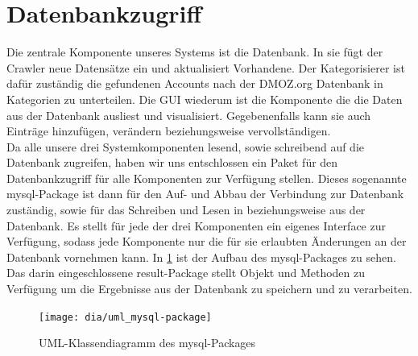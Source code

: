 \section{Datenbankzugriff}\label{sec:datenbankzugriff}
Die zentrale Komponente unseres Systems ist die Datenbank. In sie fügt der Crawler neue Datensätze ein und aktualisiert Vorhandene. Der Kategorisierer ist dafür zuständig die gefundenen Accounts nach der DMOZ.org Datenbank in Kategorien zu unterteilen. Die GUI wiederum ist die Komponente die die Daten aus der Datenbank ausliest und visualisiert. Gegebenenfalls kann sie auch Einträge hinzufügen, verändern beziehungsweise vervollständigen.
\\Da alle unsere drei Systemkomponenten lesend, sowie schreibend auf die Datenbank zugreifen, haben wir uns entschlossen ein Paket für den Datenbankzugriff für alle Komponenten zur Verfügung stellen. Dieses sogenannte mysql-Package ist dann für den Auf- und Abbau der Verbindung zur Datenbank zuständig, sowie für das Schreiben und Lesen in beziehungsweise aus der Datenbank. Es stellt für jede der drei Komponenten ein eigenes Interface zur Verfügung, sodass jede Komponente nur die für sie erlaubten Änderungen an der Datenbank vornehmen kann.
In \cref{fig:mysql-package} ist der Aufbau des mysql-Packages zu sehen. Das darin eingeschlossene result-Package stellt Objekt und Methoden zu Verfügung um die Ergebnisse aus der Datenbank zu speichern und zu verarbeiten.

\begin{figure}[h!]
	\centering
	\texttt{[image: dia/uml\_mysql-package]}
	\caption{UML-Klassendiagramm des mysql-Packages}
	\label{fig:mysql-package}
\end{figure}

